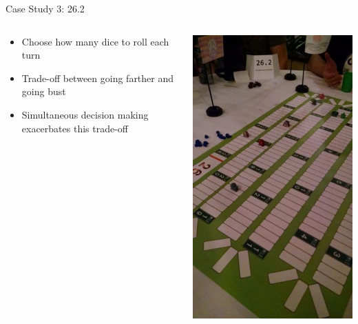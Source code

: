 \documentclass[10pt]{beamer}
\begin{document}
\begin{frame}{Case Study 3: 26.2}

\begin{columns}[T] 
\begin{column}{0.5\textwidth}
\begin{itemize}
    \item Choose how many dice to roll each turn
    \item Trade-off between going farther and going bust
    \item Simultaneous decision making exacerbates this trade-off
\end{itemize}
\end{column}
\begin{column}{0.5\textwidth}
\includegraphics[width=\textwidth, height=\textheight]{images/26point2.jpg}
\end{column}
\end{columns}
\end{frame}
\end{document}
